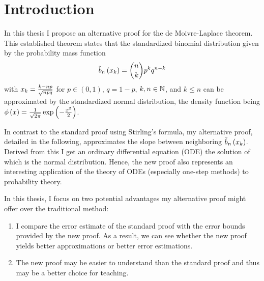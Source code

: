 \chapter{Introduction}

In this thesis I propose an alternative proof for the de Moivre-Laplace theorem. This established theorem states that the standardized binomial distribution given by the probability mass function
\begin{align}
  \bb{\x} = \binom nk p^k q^{n-k}
\end{align}
with $\x[k] = \frac{k-np}{\sqrt{npq}}$ for $p\in (0,1)$, $q=1-p$, $k,n\in\N$, and $k\le n$ can be approximated by the standardized normal distribution, the density function being $\fphi{x} = \frac{1}{\sqrt {2\pi}} \fexp{-\frac{x^2}2}$.

In contrast to the standard proof using Stirling’s formula, my alternative proof, detailed in the following, approximates the slope between neighboring $\bb{\x}$. Derived from this I get an ordinary differential equation (ODE) the solution of which is the normal distribution. Hence, the new proof also represents an interesting application of the theory of ODEs (especially one-step methods) to probability theory.

In this thesis, I focus on two potential advantages my alternative proof might offer over the traditional method:

\begin{enumerate}
  \item I compare the error estimate of the standard proof with the error bounds provided by the new proof. As a result, we can see whether the new proof yields better approximations or better error estimations.

  \item The new proof may be easier to understand than the standard proof and thus may be a better choice for teaching.
\end{enumerate}

